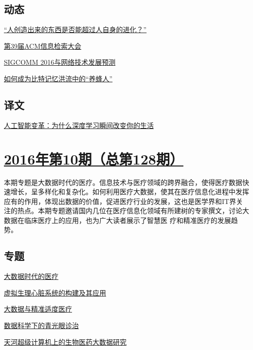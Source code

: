 \documentclass[a4paper]{article}
\begin{document}
\subsection{动态}
\href{http://history.ccf.org.cn/resources/1190201776262/2016/11/10/zhaodongyan.pdf}{“人创造出来的东西是否能超过人自身的进化？”}

\href{http://history.ccf.org.cn/resources/1190201776262/2016/11/10/liuzeyang.pdf}{第39届ACM信息检索大会}

\href{http://history.ccf.org.cn/resources/1190201776262/2016/11/10/sujinshu.pdf}{SIGCOMM 2016与网络技术发展预测}

\href{http://history.ccf.org.cn/resources/1190201776262/2016/11/10/lifei.pdf}{如何成为比特记忆洪流中的“养蜂人”}

\subsection{译文}
\href{http://history.ccf.org.cn/resources/1190201776262/2016/11/10/yiwen.pdf}{人工智能变革：为什么深度学习瞬间改变你的生活}


\section{\href{http://history.ccf.org.cn/sites/ccf/jsjtbbd.jsp?contentId=2952788900178}{\textbf{2016年第10期（总第128期）}}}
本期专题是大数据时代的医疗。信息技术与医疗领域的跨界融合，使得医疗数据快速增长，呈多样化和复杂化。如何利用医疗大数据，使其在医疗信息化进程中发挥应有的作用，体现出数据的价值，促进医疗行业的发展，这也是医学界和IT界关注的热点。本期专题邀请国内几位在医疗信息化领域有所建树的专家撰文，讨论大数据在临床医疗上的应用，也为广大读者展示了智慧医
疗和精准医疗的发展趋势。
\subsection{专题}
\href{http://history.ccf.org.cn/resources/1190201776262/2016/10/14/wuwenjun.pdf}{大数据时代的医疗}

\href{http://history.ccf.org.cn/resources/1190201776262/2016/10/14/liqince.pdf}{虚拟生理心脏系统的构建及其应用}

\href{http://history.ccf.org.cn/resources/1190201776262/2016/10/14/wangxinyan.pdf}{大数据与精准适度医疗}

\href{http://history.ccf.org.cn/resources/1190201776262/2016/10/14/zhuhaogang.pdf}{数据科学下的青光眼诊治}

\href{http://history.ccf.org.cn/resources/1190201776262/2016/10/14/pengshaoliang.pdf}{天河超级计算机上的生物医药大数据研究}
\end{document}
